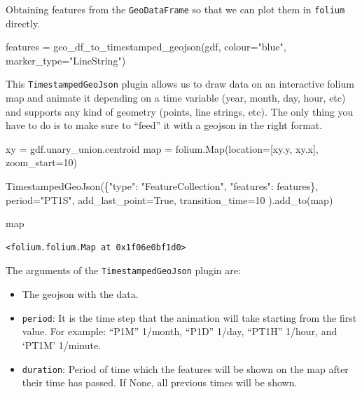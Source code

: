 \documentclass[
  letterpaper,
  DIV=11,
  numbers=noendperiod]{scrreprt}
\newenvironment{Shaded}{\begin{snugshade}}{\end{snugshade}}
\newcommand{\BuiltInTok}[1]{\textcolor[rgb]{0.00,0.23,0.31}{#1}}
\newcommand{\DecValTok}[1]{\textcolor[rgb]{0.68,0.00,0.00}{#1}}
\newcommand{\NormalTok}[1]{\textcolor[rgb]{0.00,0.23,0.31}{#1}}
\newcommand{\OperatorTok}[1]{\textcolor[rgb]{0.37,0.37,0.37}{#1}}
\newcommand{\StringTok}[1]{\textcolor[rgb]{0.13,0.47,0.30}{#1}}
\newcommand{\VariableTok}[1]{\textcolor[rgb]{0.07,0.07,0.07}{#1}}
\providecommand{\tightlist}{%
  \setlength{\itemsep}{0pt}\setlength{\parskip}{0pt}}\usepackage{longtable,booktabs,array}
\begin{document}
Obtaining features from the \texttt{GeoDataFrame} so that we can plot
them in \texttt{folium} directly.

\begin{Shaded}
\begin{Highlighting}[]
\NormalTok{features }\OperatorTok{=}\NormalTok{ geo\_df\_to\_timestamped\_geojson(gdf, colour}\OperatorTok{=}\StringTok{"blue"}\NormalTok{, marker\_type}\OperatorTok{=}\StringTok{"LineString"}\NormalTok{)}
\end{Highlighting}
\end{Shaded}

This \texttt{TimestampedGeoJson} plugin allows us to draw data on an
interactive folium map and animate it depending on a time variable
(year, month, day, hour, etc) and supports any kind of geometry (points,
line strings, etc). The only thing you have to do is to make sure to
``feed'' it with a geojson in the right format.

\begin{Shaded}
\begin{Highlighting}[]
\NormalTok{xy }\OperatorTok{=}\NormalTok{ gdf.unary\_union.centroid}
\BuiltInTok{map} \OperatorTok{=}\NormalTok{ folium.Map(location}\OperatorTok{=}\NormalTok{[xy.y, xy.x], zoom\_start}\OperatorTok{=}\DecValTok{10}\NormalTok{)}

\NormalTok{TimestampedGeoJson(\{}\StringTok{"type"}\NormalTok{: }\StringTok{"FeatureCollection"}\NormalTok{, }\StringTok{"features"}\NormalTok{: features\},}
\NormalTok{    period}\OperatorTok{=}\StringTok{"PT1S"}\NormalTok{,}
\NormalTok{    add\_last\_point}\OperatorTok{=}\VariableTok{True}\NormalTok{,}
\NormalTok{    transition\_time}\OperatorTok{=}\DecValTok{10}
\NormalTok{).add\_to(}\BuiltInTok{map}\NormalTok{)}

\BuiltInTok{map}
\end{Highlighting}
\end{Shaded}

\begin{verbatim}
<folium.folium.Map at 0x1f06e0bf1d0>
\end{verbatim}

The arguments of the \texttt{TimestampedGeoJson} plugin are:

\begin{itemize}
\tightlist
\item
  The geojson with the data.
\item
  \texttt{period}: It is the time step that the animation will take
  starting from the first value. For example: ``P1M'' 1/month, ``P1D''
  1/day, ``PT1H'' 1/hour, and `PT1M' 1/minute.
\item
  \texttt{duration}: Period of time which the features will be shown on
  the map after their time has passed. If None, all previous times will
  be shown.
\end{itemize}
\end{document}
